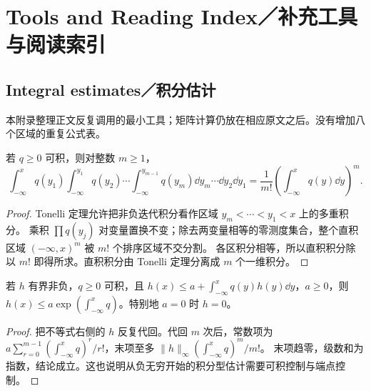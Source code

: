 \appendix
\chapter{Tools and Reading Index／补充工具与阅读索引}
\section{Integral estimates／积分估计}
\begin{note}
本附录整理正文反复调用的最小工具；矩阵计算仍放在相应原文之后。没有增加八个区域的重复公式表。
\end{note}
\begin{lemma}
若 $q\geq0$ 可积，则对整数 $m\geq1$，
\[
\int_{-\infty}^xq(y_1)\int_{-\infty}^{y_1}q(y_2)\cdots
\int_{-\infty}^{y_{m-1}}q(y_m)\dd y_m\cdots\dd y_2\dd y_1
=\dfrac{1}{m!}\left(\int_{-\infty}^xq(y)\dd y\right)^m.
\]
\end{lemma}
\begin{proof}
Tonelli 定理允许把非负迭代积分看作区域 $y_m<\cdots<y_1<x$ 上的多重积分。
乘积 $\displaystyle \prod q(y_j)$ 对变量置换不变；除去两变量相等的零测度集合，整个直积区域 $(-\infty,x)^m$ 被 $m!$ 个排序区域不交分割。
各区积分相等，所以直积积分除以 $m!$ 即得所求。直积积分由 Tonelli 定理分离成 $m$ 个一维积分。
\end{proof}
\begin{lemma}
若 $h$ 有界非负，$q\geq0$ 可积，且 $\displaystyle h(x)\leq a+\int_{-\infty}^xq(y)h(y)\dd y$，$a\geq0$，则
$\displaystyle h(x)\leq a\exp(\int_{-\infty}^xq)$。特别地 $a=0$ 时 $h=0$。
\end{lemma}
\begin{proof}
把不等式右侧的 $h$ 反复代回。代回 $m$ 次后，常数项为
$a\displaystyle\sum\limits_{r=0}^{m-1}(\int_{-\infty}^xq)^r/r!$，末项至多 $\displaystyle \|h\|_\infty(\int_{-\infty}^xq)^m/m!$。
末项趋零，级数和为指数，结论成立。这也说明从负无穷开始的积分型估计需要可积控制与端点控制。
\end{proof}
